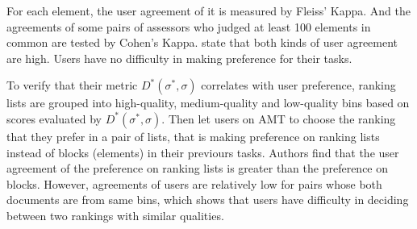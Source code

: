 \documentclass{article}
\begin{document}
For each element, the user agreement of it is measured by Fleiss' Kappa. And the agreements of some pairs of assessors who judged at least 100 elements in common are tested by Cohen's Kappa. \citet{eval.aggregated.search} state that both kinds of user agreement are high. Users have no difficulty in making preference for their tasks.

To verify that their metric $D^*(\sigma^*, \sigma)$ correlates with user preference, ranking lists are grouped into high-quality, medium-quality and low-quality bins based on scores evaluated by $D^*(\sigma^*, \sigma)$. Then let users on AMT to choose the ranking that they prefer in a pair of lists, that is making preference on ranking lists instead of blocks (elements) in their previours tasks. Authors find that the user agreement of the preference on ranking lists is greater than the preference on blocks. However, agreements of users are relatively low for pairs whose both documents are from same bins, which shows that users have difficulty in deciding between two rankings with similar qualities.









\end{document}
